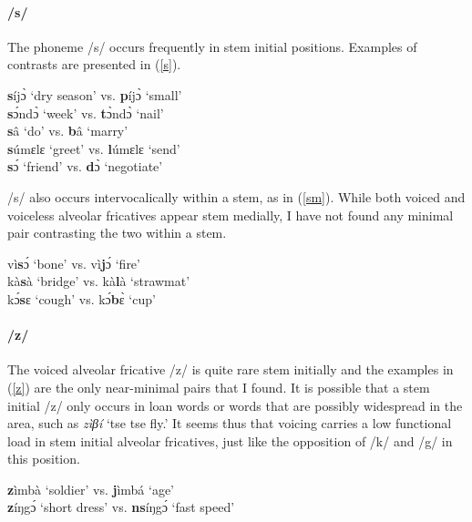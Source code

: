 \paragraph{\bfseries /s/} The phoneme /s/ occurs frequently in stem initial positions. Examples of contrasts are presented in (\ref{s}).

\begin{exe} \ex \label{s}
{\bfseries s}íjɔ̀ `dry season' vs. {\bfseries p}íjɔ̀ `small' \\
{\bfseries s}ɔ́ndɔ̀ `week' vs. {\bfseries t}ɔ̀ndɔ̀ `nail' \\
{\bfseries s}â `do' vs. {\bfseries b}â `marry' \\
{\bfseries s}úmɛlɛ `greet' vs. {\bfseries l}úmɛlɛ `send' \\
{\bfseries s}ɔ́ `friend' vs. {\bfseries d}ɔ̀ `negotiate'
\end{exe}

\noindent /s/ also occurs intervocalically within a stem, as in (\ref{sm}). While both voiced and voiceless alveolar fricatives appear stem medially, I have not found any minimal pair contrasting the two within a stem.

\begin{exe} \ex \label{sm}
vì{\bfseries s}ɔ́ `bone' vs. vì{\bfseries j}ɔ́ `fire' \\
kà{\bfseries s}à `bridge' vs. kà{\bfseries l}à `strawmat' \\
kɔ́{\bfseries s}ɛ `cough' vs. kɔ́{\bfseries b}ɛ̀ `cup'
\end{exe}

\paragraph{\bfseries /z/} The voiced alveolar fricative /z/ is quite rare stem initially and the examples in (\ref{z}) are the only near-minimal pairs that I found. It is possible that a stem initial /z/ only occurs in loan words or words that are possibly widespread in the area, such as {\itshape zìβí} `tse tse fly.' 
It seems thus that voicing carries a low functional load in stem initial alveolar fricatives, just like the opposition of /k/ and /g/ in this position.

\begin{exe} \ex \label{z}
{\bfseries z}ìmbà `soldier' vs. {\bfseries j}ìmbá `age' \\
{\bfseries z}íŋgɔ́ `short dress' vs. {\bfseries ns}íŋgɔ́ `fast speed'
\end{exe}

